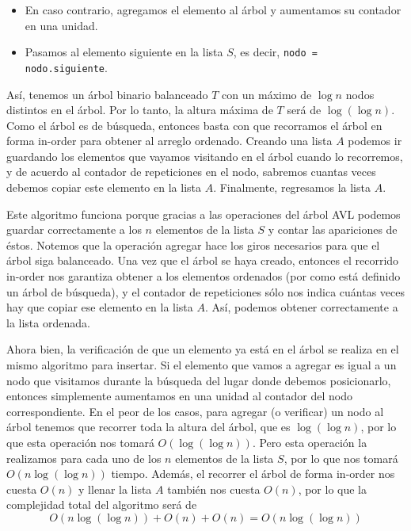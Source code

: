 \documentclass[letterpaper,11pt]{article}
\begin{document}
\begin{enumerate}
\begin{itemize}
\begin{enumerate}
\begin{itemize}
                \item En caso contrario, agregamos el elemento al árbol y 
                aumentamos su contador en una unidad. 

                \item Pasamos al elemento siguiente en la lista $S$, es decir, 
                \texttt{nodo = nodo.siguiente}.
            \end{itemize}
        \end{enumerate}

        Así, tenemos un árbol binario balanceado $T$ con un máximo de 
        $\log n$ nodos distintos en el árbol. Por lo tanto, la altura máxima 
        de $T$ será de $\log (\log n)$. Como el árbol es de búsqueda, entonces 
        basta con que recorramos el árbol en forma in-order para obtener al 
        arreglo ordenado. Creando una lista $A$ podemos ir guardando los 
        elementos que vayamos visitando en el árbol cuando lo recorremos, y de 
        acuerdo al contador de repeticiones en el nodo, sabremos cuantas veces 
        debemos copiar este elemento en la lista $A$. Finalmente, regresamos
        la lista $A$.

        Este algoritmo funciona porque gracias a las operaciones del árbol 
        AVL podemos guardar correctamente a los $n$ elementos de la lista 
        $S$ y contar las apariciones de éstos. Notemos que la operación 
        agregar hace los giros necesarios para que el árbol siga balanceado.
        Una vez que el árbol se haya creado, entonces el recorrido in-order 
        nos garantiza obtener a los elementos ordenados (por como está 
        definido un árbol de búsqueda), y el contador de repeticiones sólo nos 
        indica cuántas veces hay que copiar ese elemento en la lista $A$.
        Así, podemos obtener correctamente a la lista ordenada.

        Ahora bien, la verificación de que un elemento ya está en el árbol se 
        realiza en el mismo algoritmo para insertar. Si el elemento que vamos 
        a agregar es igual a un nodo que visitamos durante la búsqueda del 
        lugar donde debemos posicionarlo, entonces simplemente aumentamos en 
        una unidad al contador del nodo correspondiente. En el peor de los 
        casos, para agregar (o verificar) un nodo al árbol tenemos que recorrer 
        toda la altura del árbol, que es $\log (\log n)$, por lo que esta 
        operación nos tomará $O(\log (\log n))$. Pero esta operación la 
        realizamos para cada uno de los $n$ elementos de la lista $S$, por lo 
        que nos tomará $O(n \log (\log n))$ tiempo. Además, el recorrer el 
        árbol de forma in-order nos cuesta $O(n)$ y llenar la lista $A$ también 
        nos cuesta $O(n)$, por lo que la complejidad total del algoritmo será 
        de 
        \begin{equation*}
            O(n \log (\log n)) + O(n) + O(n) = O(n \log (\log n))
        \end{equation*}


\end{itemize}
\end{enumerate}
\end{document}
